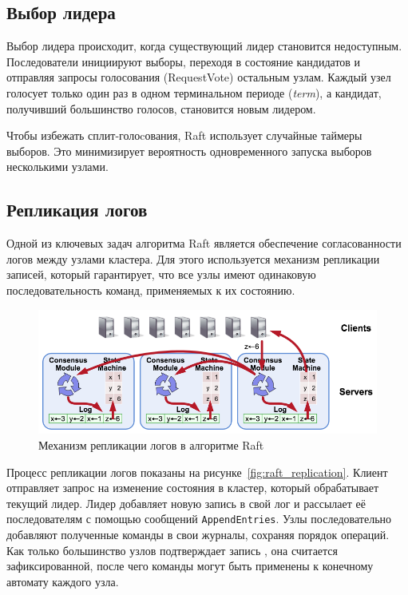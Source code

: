 \subsection{Выбор лидера}

Выбор лидера происходит, когда существующий лидер становится недоступным. Последователи
инициируют выборы, переходя в состояние кандидатов и отправляя запросы голосования
(RequestVote) остальным узлам. Каждый узел голосует только один раз в одном терминальном
периоде (\textit{term}), а кандидат, получивший большинство голосов, становится новым
лидером.  

Чтобы избежать сплит-голоcования, Raft использует случайные таймеры выборов. Это
минимизирует вероятность одновременного запуска выборов несколькими узлами.

\subsection{Репликация логов}

Одной из ключевых задач алгоритма Raft является обеспечение согласованности логов между
узлами кластера. Для этого используется механизм репликации записей, который гарантирует,
что все узлы имеют одинаковую последовательность команд, применяемых к их состоянию.

\begin{figure}
  \centering
  \includegraphics[scale=0.6]{assets/raft_replication.png}
  \caption{Механизм репликации логов в алгоритме Raft}
  \label{fig:raft-replication}
\end{figure}

Процесс репликации логов показаны на рисунке~\ref{fig:raft_replication}. Клиент
отправляет запрос на изменение состояния в кластер, который обрабатывает текущий лидер.
Лидер добавляет новую запись в свой лог и рассылает её последователям с помощью
сообщений \texttt{AppendEntries}. Узлы последовательно добавляют полученные команды в
свои журналы, сохраняя порядок операций. Как только большинство узлов подтверждает запись
, она считается зафиксированной, после чего команды могут быть применены к конечному
автомату каждого узла.

